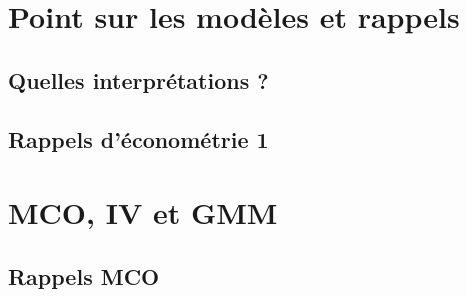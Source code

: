 \documentclass[12pt, french]{article}
\begin{document}

\newpage

\pagestyle{fancy}
\fancyhead[L]{}
\fancyhead[R]{}
\tableofcontents
\break

\pagestyle{fancy}
\fancyhead[L]{\leftmark}
\fancyhead[R]{}

\section{Point sur les modèles et rappels}
\subsection{Quelles interprétations ?}

\subsection{Rappels d'économétrie 1}
%

\section{MCO, IV et GMM}
%
\subsection{Rappels MCO}
%
\end{document}
